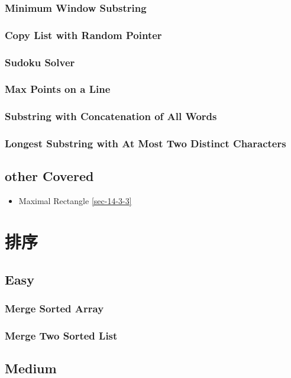 \documentclass[12pt]{book}
\begin{document}
\subsection{Minimum Window Substring}
\label{sec-6-3-1}
\subsection{Copy List with Random Pointer}
\label{sec-6-3-2}
\subsection{Sudoku Solver}
\label{sec-6-3-3}
\subsection{Max Points on a Line}
\label{sec-6-3-4}
\subsection{Substring with Concatenation of All Words}
\label{sec-6-3-5}
\subsection{Longest Substring with At Most Two Distinct Characters}
\label{sec-6-3-6}
\section{other Covered}
\label{sec-6-4}
\begin{itemize}
\item Maximal Rectangle
\ref{sec-14-3-3}
\end{itemize}
\chapter{排序}
\label{sec-7}
\section{Easy}
\label{sec-7-1}
\subsection{Merge Sorted Array}
\label{sec-7-1-1}
\subsection{Merge Two Sorted List}
\label{sec-7-1-2}
\section{Medium}
\label{sec-7-2}
\end{document}
